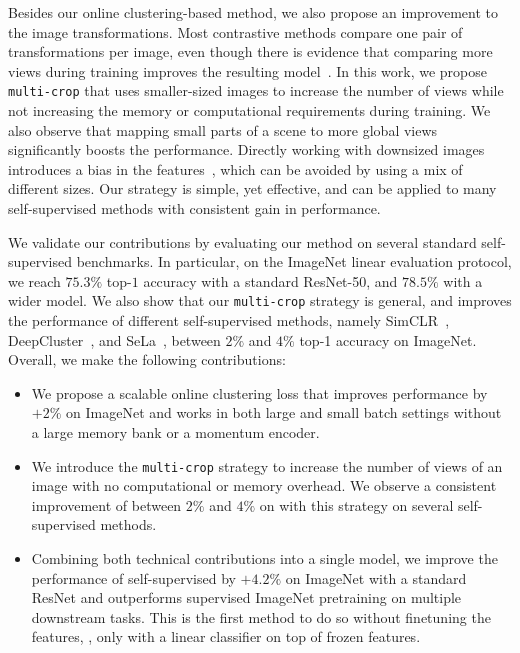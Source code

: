 Besides our online clustering-based method, we also propose an improvement to the image transformations.
Most contrastive methods compare one pair of transformations per image, even though there is evidence that comparing more views during training improves the resulting model~\cite{misra2019self}. 
In this work, we propose \texttt{multi-crop} that uses smaller-sized images to increase the number of views while not increasing the memory or computational requirements during training. 
We also observe that mapping small parts of a scene to more global views significantly boosts the performance.
Directly working with downsized images introduces a bias in the features~\cite{touvron2019fixing}, which can be avoided by using a mix of different sizes. 
Our strategy is simple, yet effective, and can be applied to many self-supervised methods with consistent gain in performance.

We validate our contributions by evaluating our method on several standard self-supervised benchmarks.
In particular, on the ImageNet linear evaluation protocol, we reach $75.3\%$ top-$1$ accuracy with a standard ResNet-50, and $78.5\%$ with a wider model.
We also show that our \texttt{multi-crop} strategy is general, and improves the performance of different self-supervised methods, namely SimCLR~\cite{chen2020simple}, DeepCluster~\cite{caron2018deep}, and SeLa~\cite{asano2019self}, between $2\%$ and $4\%$ top-1 accuracy on ImageNet.
Overall, we make the following contributions:
\begin{itemize}[leftmargin=*]
\itemsep0.05em 

\item
We propose a scalable online clustering loss that improves performance by $+2\%$ on ImageNet and works in both large and small batch settings without a large memory bank or a momentum encoder.
\item
We introduce the \texttt{multi-crop} strategy to increase the number of views of an image with no computational or memory overhead.
We observe a consistent improvement of between $2\%$ and $4\%$ on \ImNet with this strategy on several self-supervised methods.
\item
Combining both technical contributions into a single model, we improve the performance of self-supervised by $+4.2\%$ on ImageNet with a standard ResNet and outperforms supervised ImageNet pretraining on multiple downstream tasks.
This is the first method to do so without finetuning the features, \ie, only with a linear classifier on top of frozen features.
\end{itemize}
